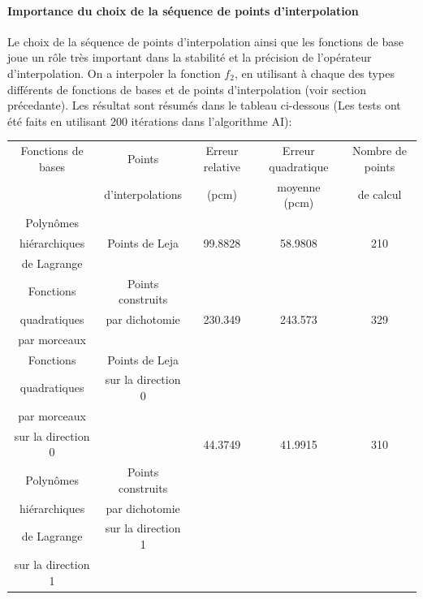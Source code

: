 \paragraph{Importance du choix de la séquence de points d'interpolation}
Le choix de la séquence de points d'interpolation ainsi que les fonctions de base joue un rôle très important dans la stabilité et la précision de l'opérateur d'interpolation.
On a interpoler la fonction $f_2$, en utilisant à chaque des types différents de fonctions de bases et de points d'interpolation (voir section précedante).
Les résultat sont résumés dans le tableau ci-dessous (Les tests ont été faits en utilisant 200 itérations dans l'algorithme AI):

\begin{center}
\begin{tabular}{|*{5}{c|}}
	\hline
	Fonctions de bases 		& Points 			 									& Erreur relative	& Erreur quadratique 	& Nombre de points		\\
												&	d'interpolations							&	 (pcm)					& moyenne (pcm)			 	& de calcul 					\\
	\hline
	Polynômes  						&&&&\\
	hiérarchiques					& Points de Leja 		 						& 99.8828					& 58.9808 						& 210									\\
	de Lagrange						&&&&\\
	\hline
	Fonctions 						&	Points construits 						&&&\\
	quadratiques 					&	par dichotomie								&	230.349 				& 243.573							& 329 								\\
	par morceaux  				&   					   								&&&\\
	\hline
	Fonctions     				& Points de Leja 								&&&\\
	quadratiques					& sur la direction 0 						&&&\\
	par morceaux					& 															&&&\\
	sur la direction 0		&																&	44.3749 				& 41.9915							& 310 								\\
	Polynômes     				& Points construits 						&&&\\
	hiérarchiques					& par dichotomie								&&&\\
	de Lagrange						& sur la direction 1						&&&\\
	sur la direction 1		&																&&&\\
	\hline
\end{tabular}
\end{center}

